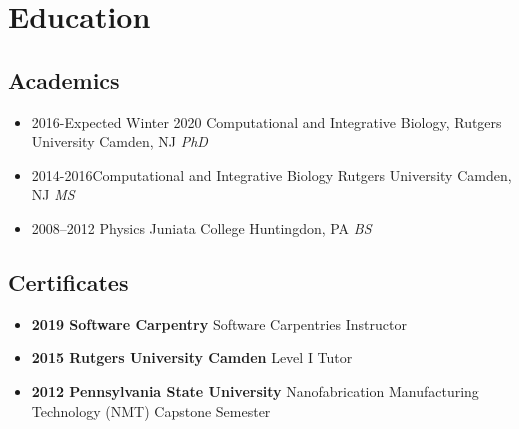 


\section*{Education}

\vspace{5pt}

\subsection*{Academics}

\vspace{5pt}

\begin{itemize}

        \item{2016-Expected Winter 2020 Computational and Integrative Biology, Rutgers University Camden, NJ \textit{PhD}} 
        \item{2014-2016Computational and Integrative Biology Rutgers University Camden, NJ \textit{MS} }
        \item{2008--2012 Physics Juniata College Huntingdon, PA \textit{BS}}

\end{itemize}

\vspace{2pt}
\subsection*{Certificates} 
\begin{itemize}
    \item{\textbf{2019 Software Carpentry}  Software Carpentries Instructor}
    \vspace{2pt}
    \item{\textbf{2015 Rutgers University Camden}  Level I Tutor}
    \vspace{2pt}
    \item{\textbf{2012 Pennsylvania State University} Nanofabrication Manufacturing Technology (NMT) Capstone Semester}
    \vspace{2pt}
\end{itemize}
